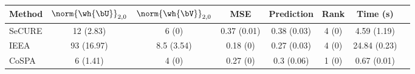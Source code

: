 \begin{tabular}{lccccccc} 
\toprule 
Method & $\norm{\wh{\bU}}_{2,0}$ & $\norm{\wh{\bV}}_{2,0}$ & MSE & Prediction & Rank & Time (s) \\ 
\midrule 
 SeCURE & 12 (2.83) & 6 (0) & 0.37 (0.01) & 0.38 (0.03) & 4 (0) & 4.59 (1.19) \\ 
IEEA & 93 (16.97) & 8.5 (3.54) & 0.18 (0) & 0.27 (0.03) & 4 (0) & 24.84 (0.23) \\ 
CoSPA & 6 (1.41) & 4 (0) & 0.27 (0) & 0.3 (0.06) & 1 (0) & 0.67 (0.01) \\ 
\bottomrule 
\end{tabular} 
